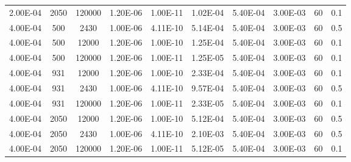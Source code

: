 \documentclass[../thesis.tex]{subfiles}
\begin{document}
\begin{landscape}
\begin{table}[htb]
\begin{tabular}{cccccccccc}
			2.00E-04            & 2050        & 120000      & 1.20E-06               & 1.00E-11               & 1.02E-04              & 5.40E-04      & 3.00E-03        & 60                            & 0.1                       \\
			4.00E-04            & 500         & 2430        & 1.00E-06               & 4.11E-10               & 5.14E-04              & 5.40E-04      & 3.00E-03        & 60                            & 0.5                       \\
			4.00E-04            & 500         & 12000       & 1.20E-06               & 1.00E-10               & 1.25E-04              & 5.40E-04      & 3.00E-03        & 60                            & 0.1                       \\
			4.00E-04            & 500         & 120000      & 1.20E-06               & 1.00E-11               & 1.25E-05              & 5.40E-04      & 3.00E-03        & 60                            & 0.1                       \\
			4.00E-04            & 931         & 12000       & 1.20E-06               & 1.00E-10               & 2.33E-04              & 5.40E-04      & 3.00E-03        & 60                            & 0.1                       \\
			4.00E-04            & 931         & 2430        & 1.00E-06               & 4.11E-10               & 9.57E-04              & 5.40E-04      & 3.00E-03        & 60                            & 0.5                       \\
			4.00E-04            & 931         & 120000      & 1.20E-06               & 1.00E-11               & 2.33E-05              & 5.40E-04      & 3.00E-03        & 60                            & 0.1                       \\
			4.00E-04            & 2050        & 12000       & 1.20E-06               & 1.00E-10               & 5.12E-04              & 5.40E-04      & 3.00E-03        & 60                            & 0.5                       \\
			4.00E-04            & 2050        & 2430        & 1.00E-06               & 4.11E-10               & 2.10E-03              & 5.40E-04      & 3.00E-03        & 60                            & 0.5                       \\
			4.00E-04            & 2050        & 120000      & 1.20E-06               & 1.00E-11               & 5.12E-05              & 5.40E-04      & 3.00E-03        & 60                            & 0.1                       \\

\end{tabular}
\end{table}
\end{landscape}
\end{document}
